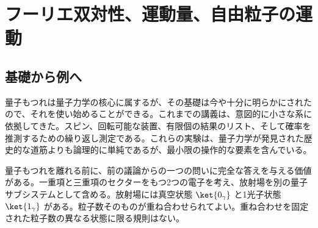 \chapter{フーリエ双対性、運動量、自由粒子の運動}

\section{基礎から例へ}

量子もつれは量子力学の核心に属するが、その基礎は今や十分に明らかにされたので、それを使い始めることができる。これまでの講義は、意図的に小さな系に依拠してきた。スピン、回転可能な装置、有限個の結果のリスト、そして確率を推測するための繰り返し測定である。これらの実験は、量子力学が発見された歴史的な道筋よりも論理的に単純であるが、最小限の操作的な要素を含んでいる。

\begin{classroomqa}
\end{classroomqa}

\begin{classroomqa}
\end{classroomqa}

量子もつれを離れる前に、前の議論からの一つの問いに完全な答えを与える価値がある。一重項と三重項のセクターをもつ2つの電子を考え、放射場を別の量子サブシステムとして含める。放射場には真空状態 \(\ket{0_\gamma}\) と1光子状態 \(\ket{1_\gamma}\) がある。粒子数そのものが重ね合わせられてよい。重ね合わせを固定された粒子数の異なる状態に限る規則はない。

